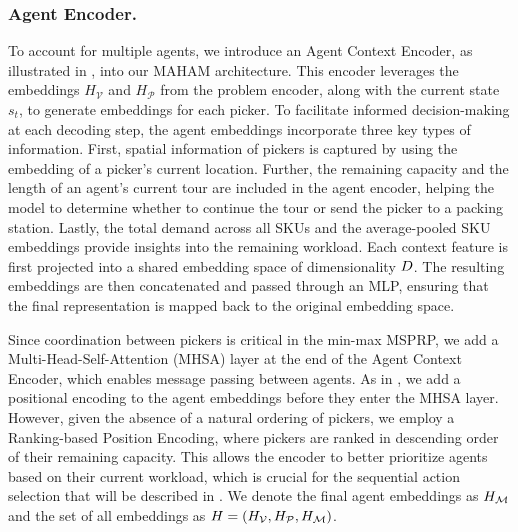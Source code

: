 \subsubsection{Agent Encoder.}
To account for multiple agents, we introduce an Agent Context Encoder, as illustrated in , into our MAHAM architecture. This encoder leverages the embeddings $H_\mathcal{V}$ and $H_\mathcal{P}$ from the problem encoder, along with the current state $s_t$, to generate embeddings for each picker.  
To facilitate informed decision-making at each decoding step, the agent embeddings incorporate three key types of information. First, spatial information of pickers is captured by using the embedding of a picker's current location. 
Further, the remaining capacity and the length of an agent's current tour are included in the agent encoder, helping the model to determine whether to continue the tour or send the picker to a packing station.
Lastly, the total demand across all SKUs and the average-pooled SKU embeddings provide insights into the remaining workload. 
Each context feature is first projected into a shared embedding space of dimensionality ${D}$. The resulting embeddings are then concatenated and passed through an MLP, ensuring that the final representation is mapped back to the original embedding space.

Since coordination between pickers is critical in the min-max MSPRP, we add a Multi-Head-Self-Attention (MHSA) layer \cite{vaswaniAttentionAllYou2017a} at the end of the Agent Context Encoder, which enables message passing between agents. As in \cite{vaswaniAttentionAllYou2017a}, we add a positional encoding to the agent embeddings before they enter the MHSA layer. However, given the absence of a natural ordering of pickers, we employ a Ranking-based Position Encoding, where pickers are ranked in descending order of their remaining capacity. This allows the encoder to better prioritize agents based on their current workload, which is crucial for the sequential action selection that will be described in . We denote the final agent embeddings as $H_{\mathcal{M}}$ and the set of all embeddings as $H=(H_\mathcal{V},H_\mathcal{P},H_{\mathcal{M}})$.

